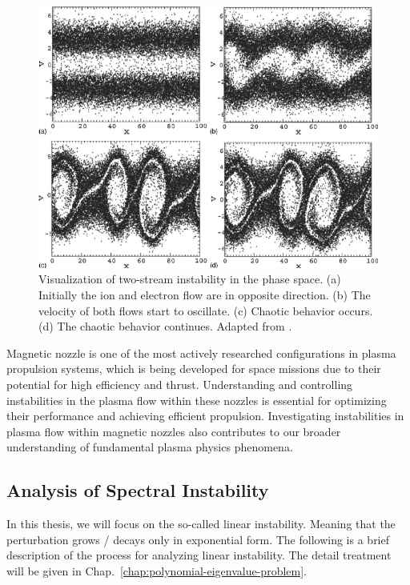\begin{figure}[htbp]
	\centering
	\includegraphics[width=0.7\linewidth]{figures/two-stream-instability}
	\caption{Visualization of two-stream instability in the phase space. (a) Initially the ion and electron flow are in opposite direction. (b) The velocity of both flows start to oscillate. (c) Chaotic behavior occurs. (d) The chaotic behavior continues. Adapted from \cite{ha_nonlinear_2011}.}
	\label{fig:two-stream-instability}
\end{figure}

Magnetic nozzle is one of the most actively researched configurations in plasma propulsion systems, which is being developed for space missions due to their potential for high efficiency and thrust. Understanding and controlling instabilities in the plasma flow within these nozzles is essential for optimizing their performance and achieving efficient propulsion. Investigating instabilities in plasma flow within magnetic nozzles also contributes to our broader understanding of fundamental plasma physics phenomena.


\subsection{Analysis of Spectral Instability}
In this thesis, we will focus on the so-called linear instability. Meaning that the perturbation grows / decays only in exponential form. The following is a brief description of the process for analyzing linear instability. The detail treatment will be given in Chap.~\ref{chap:polynomial-eigenvalue-problem}.

